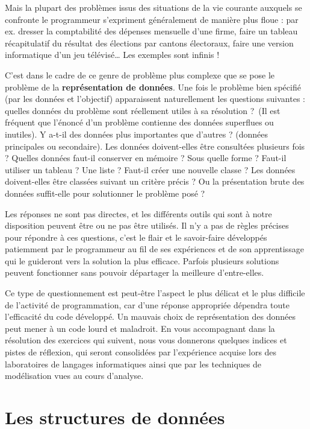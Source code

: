 Mais la plupart des problèmes issus des situations de la vie courante
auxquels se confronte le programmeur s’expriment généralement de
manière plus floue : par ex. dresser la comptabilité des dépenses
mensuelle d’une firme, faire un tableau récapitulatif du résultat des
élections par cantons électoraux, faire une version informatique d’un
jeu télévisé… Les exemples sont infinis !


C’est dans le cadre de ce genre de problème plus complexe que se pose le
problème de la \textbf{représentation de données}. Une fois le problème
bien spécifié (par les données et l’objectif) apparaissent
naturellement les questions suivantes : quelles données du problème
sont réellement utiles à sa résolution ?~(Il est fréquent que l’énoncé
d’un problème contienne des données superflues ou inutiles). Y a-t-il
des données plus importantes que d’autres ? (données principales ou
secondaire). Les données doivent-elles être consultées plusieurs fois ?
Quelles données faut-il conserver en mémoire ? Sous quelle forme ?
Faut-il utiliser un tableau ? Une liste ? Faut-il créer une nouvelle
classe ? Les données doivent-elles être classées suivant un critère
précis ? Ou la présentation brute des données suffit-elle pour
solutionner le problème posé ?

Les réponses ne sont pas directes, et les différents outils qui sont à
notre disposition peuvent être ou ne pas être utilisés. Il n’y a pas de
règles précises pour répondre à ces questions, c’est le flair et le
savoir-faire développés patiemment par le programmeur au fil de ses
expériences et de son apprentissage qui le guideront vers la solution
la plus efficace. Parfois plusieurs solutions peuvent fonctionner sans
pouvoir départager la meilleure d’entre-elles.

Ce type de questionnement est peut-être l’aspect le plus délicat et le
plus difficile de l’activité de programmation, car d’une réponse
appropriée dépendra toute l’efficacité du code développé. Un mauvais
choix de représentation des données peut mener à un code lourd et
maladroit. 
En vous accompagnant dans la résolution des exercices qui suivent,
nous vous donnerons quelques indices et pistes de réflexion, 
qui seront consolidées par l’expérience acquise lors des
laboratoires de langages informatiques ainsi que par les techniques de
modélisation vues au cours d’analyse.


\section{Les structures de données%
}

